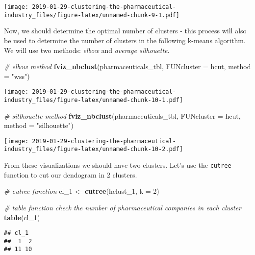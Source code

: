 \documentclass[]{article}
\newenvironment{Shaded}{\begin{snugshade}}{\end{snugshade}}
\newcommand{\KeywordTok}[1]{\textcolor[rgb]{0.13,0.29,0.53}{\textbf{#1}}}
\newcommand{\DataTypeTok}[1]{\textcolor[rgb]{0.13,0.29,0.53}{#1}}
\newcommand{\DecValTok}[1]{\textcolor[rgb]{0.00,0.00,0.81}{#1}}
\newcommand{\StringTok}[1]{\textcolor[rgb]{0.31,0.60,0.02}{#1}}
\newcommand{\CommentTok}[1]{\textcolor[rgb]{0.56,0.35,0.01}{\textit{#1}}}
\newcommand{\NormalTok}[1]{#1}
\begin{document}
\texttt{[image: 2019-01-29-clustering-the-pharmaceutical-industry\_files/figure-latex/unnamed-chunk-9-1.pdf]}

Now, we should determine the optimal number of clusters - this process
will also be used to determine the number of clusters in the following
k-means algorithm. We will use two methods: \emph{elbow} and
\emph{average silhouette}.

\begin{Shaded}
\begin{Highlighting}[]
\CommentTok{# elbow method}
\KeywordTok{fviz_nbclust}\NormalTok{(pharmaceuticals_tbl, }\DataTypeTok{FUNcluster =}\NormalTok{ hcut, }\DataTypeTok{method =} \StringTok{"wss"}\NormalTok{)}
\end{Highlighting}
\end{Shaded}

\texttt{[image: 2019-01-29-clustering-the-pharmaceutical-industry\_files/figure-latex/unnamed-chunk-10-1.pdf]}

\begin{Shaded}
\begin{Highlighting}[]
\CommentTok{# sillhouette method}
\KeywordTok{fviz_nbclust}\NormalTok{(pharmaceuticals_tbl, }\DataTypeTok{FUNcluster =}\NormalTok{ hcut, }\DataTypeTok{method =} \StringTok{"silhouette"}\NormalTok{)}
\end{Highlighting}
\end{Shaded}

\texttt{[image: 2019-01-29-clustering-the-pharmaceutical-industry\_files/figure-latex/unnamed-chunk-10-2.pdf]}

From these visualizations we should have two clusters. Let's use the
\texttt{cutree} function to cut our dendogram in 2 clusters.

\begin{Shaded}
\begin{Highlighting}[]
\CommentTok{# cutree function}
\NormalTok{cl_}\DecValTok{1}\NormalTok{ <-}\StringTok{ }\KeywordTok{cutree}\NormalTok{(hclust_}\DecValTok{1}\NormalTok{, }\DataTypeTok{k =} \DecValTok{2}\NormalTok{)}

\CommentTok{# table function check the number of pharmaceutical companies in each cluster}
\KeywordTok{table}\NormalTok{(cl_}\DecValTok{1}\NormalTok{)}
\end{Highlighting}
\end{Shaded}

\begin{verbatim}
## cl_1
##  1  2 
## 11 10
\end{verbatim}
\end{document}
